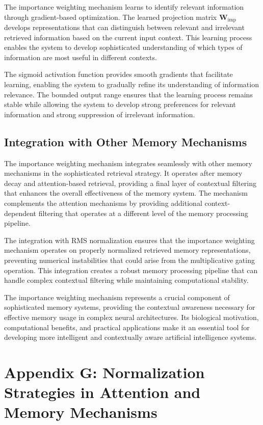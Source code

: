 \documentclass{article}
\begin{document}
The importance weighting mechanism learns to identify relevant information through gradient-based optimization. The learned projection matrix $\mathbf{W}_{\text{imp}}$ develops representations that can distinguish between relevant and irrelevant retrieved information based on the current input context. This learning process enables the system to develop sophisticated understanding of which types of information are most useful in different contexts.

The sigmoid activation function provides smooth gradients that facilitate learning, enabling the system to gradually refine its understanding of information relevance. The bounded output range ensures that the learning process remains stable while allowing the system to develop strong preferences for relevant information and strong suppression of irrelevant information.

\subsection{Integration with Other Memory Mechanisms}

The importance weighting mechanism integrates seamlessly with other memory mechanisms in the sophisticated retrieval strategy. It operates after memory decay and attention-based retrieval, providing a final layer of contextual filtering that enhances the overall effectiveness of the memory system. The mechanism complements the attention mechanisms by providing additional context-dependent filtering that operates at a different level of the memory processing pipeline.

The integration with RMS normalization ensures that the importance weighting mechanism operates on properly normalized retrieved memory representations, preventing numerical instabilities that could arise from the multiplicative gating operation. This integration creates a robust memory processing pipeline that can handle complex contextual filtering while maintaining computational stability.

The importance weighting mechanism represents a crucial component of sophisticated memory systems, providing the contextual awareness necessary for effective memory usage in complex neural architectures. Its biological motivation, computational benefits, and practical applications make it an essential tool for developing more intelligent and contextually aware artificial intelligence systems.

\section{Appendix G: Normalization Strategies in Attention and Memory Mechanisms}
\end{document}
